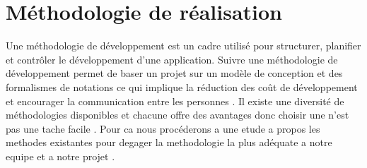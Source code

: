 \documentclass[11pt,a4paper,oneside]{book}
\begin{document}
	
	\section{Méthodologie de réalisation }
	Une méthodologie de développement est un cadre utilisé pour structurer, planifier et contrôler le développement d’une application. Suivre une méthodologie de développement permet de baser un projet sur un modèle de conception et des formalismes de notations ce qui implique la réduction des coût de développement et encourager la communication entre les personnes . Il existe une diversité de méthodologies disponibles et chacune offre des avantages donc choisir une n’est pas une tache facile . Pour ca nous procéderons a une etude a propos les methodes existantes pour degager la methodologie la plus adéquate a notre equipe et a notre projet .
	
\end{document}
